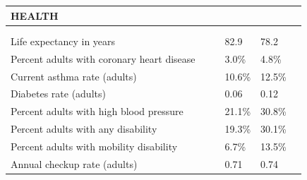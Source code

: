 \documentclass[9pt]{report}
\begin{document}
\newpage
\setlength{\tabcolsep}{.01in} %
\begin{tabular}{p{.10in}p{.10in}p{.10in}p{3.7in}>{\hfill}p{.85in}>{\hfill}p{.85in}>{\hfill}p{.85in}>{\hfill}p{.85in}p{0.1in}}
\multicolumn{9}{l}{\parbox{7.1in}{\raggedright{\large{\strut\textbf{HEALTH}\strut}}}} \\ 
\hline
\multicolumn{4}{l}{\parbox{3.5in}{\raggedright{\textbf{}}}} & \multicolumn{1}{r}{\parbox{.85in}{\strut\raggedleft{\textbf{}\strut}}} & \multicolumn{1}{r}{\parbox{.85in}{\strut\raggedleft{\textbf{}\strut}}} & \multicolumn{1}{r}{\parbox{.85in}{\strut{}}} & \multicolumn{1}{r}{\parbox{.85in}{\strut{}}} & \\ 
\multicolumn{9}{l}{} \\ 
\multicolumn{4}{l}{\parbox{3.6in}{\strut\raggedright{{Life expectancy in years}}\strut}} &  &  & 82.9 & 78.2 & \multicolumn{1}{l}{}  \\ 
\multicolumn{4}{l}{\parbox{3.6in}{\strut\raggedright{{Percent adults with coronary heart disease}}\strut}} &  &  & 3.0\% & 4.8\% & \multicolumn{1}{l}{}  \\ 
\multicolumn{4}{l}{\parbox{3.6in}{\strut\raggedright{{Current asthma rate (adults)}}\strut}} &  &  & 10.6\% & 12.5\% & \multicolumn{1}{l}{}  \\ 
\multicolumn{4}{l}{\parbox{3.6in}{\strut\raggedright{{Diabetes rate (adults)}}\strut}} &  &  & 0.06 & 0.12 & \multicolumn{1}{l}{}  \\ 
\multicolumn{4}{l}{\parbox{3.6in}{\strut\raggedright{{Percent adults with high blood pressure}}\strut}} &  &  & 21.1\% & 30.8\% & \multicolumn{1}{l}{}  \\ 
\multicolumn{4}{l}{\parbox{3.6in}{\strut\raggedright{{Percent adults with any disability}}\strut}} &  &  & 19.3\% & 30.1\% & \multicolumn{1}{l}{}  \\ 
\multicolumn{4}{l}{\parbox{3.6in}{\strut\raggedright{{Percent adults with mobility disability}}\strut}} &  &  & 6.7\% & 13.5\% & \multicolumn{1}{l}{}  \\ 
\multicolumn{4}{l}{\parbox{3.6in}{\strut\raggedright{{Annual checkup rate (adults)}}\strut}} &  &  & 0.71 & 0.74 & \multicolumn{1}{l}{}  \\ 

\end{tabular}
\end{document}
